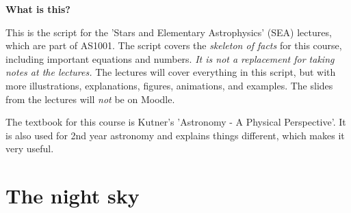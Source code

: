 \textbf{What is this?}

This is the script for the 'Stars and Elementary Astrophysics' (SEA) lectures, which are part of AS1001. The script covers the \textit{skeleton of facts} for this course, including important equations and numbers. \textit{It is not a replacement for taking notes at the lectures.} The lectures will cover everything in this script, but with more illustrations, explanations, figures, animations, and examples. The slides from the lectures will \textit{not} be on Moodle.
 
The textbook for this course is Kutner's 'Astronomy - A Physical Perspective'. It is also used for 2nd year astronomy and explains things different, which makes it very useful. 

\section{The night sky}

